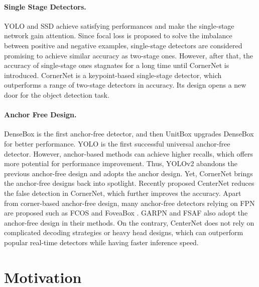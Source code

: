 \documentclass[letterpaper]{article} \usepackage{aaai20}  \usepackage{times}  \usepackage{helvet} \usepackage{courier}  \usepackage[hyphens]{url}  \usepackage{graphicx} \urlstyle{rm} \def\UrlFont{\rm}  \usepackage{graphicx}  \frenchspacing  \setlength{\pdfpagewidth}{8.5in}  \setlength{\pdfpageheight}{11in}  \usepackage{subcaption}
\begin{document}
\paragraph{Single Stage Detectors.} YOLO \cite{redmon2016you} and SSD \cite{liu2016ssd} achieve satisfying performances and make the single-stage network gain attention. Since focal loss is proposed \cite{lin2017focal} to solve the imbalance between positive and negative examples, single-stage detectors are considered promising to achieve similar accuracy as two-stage ones. However, after that, the accuracy of single-stage ones stagnates for a long time until CornerNet \cite{law2018cornernet} is introduced. CornerNet is a keypoint-based single-stage detector, which outperforms a range of two-stage detectors in accuracy. Its design opens a new door for the object detection task.

\paragraph{Anchor Free Design.} DenseBox \cite{DBLP:journals/corr/HuangYDY15} is the first anchor-free detector, and then UnitBox \cite{yu2016unitbox} upgrades DenseBox for better performance. YOLO is the first successful universal anchor-free detector. However, anchor-based methods \cite{ren2015faster,liu2016ssd} can achieve higher recalls, which offers more potential for performance improvement. Thus, YOLOv2 \cite{redmon2017yolo9000} abandons the previous anchor-free design and adopts the anchor design. Yet, CornerNet brings the anchor-free designs back into spotlight. Recently proposed CenterNet \cite{DBLP:journals/corr/abs-1904-08189} reduces the false detection in CornerNet, which further improves the accuracy. Apart from corner-based anchor-free design, many anchor-free detectors relying on FPN are proposed such as FCOS \cite{DBLP:journals/corr/abs-1904-01355} and FoveaBox \cite{DBLP:journals/corr/abs-1904-03797}. GARPN \cite{wang2019region} and FSAF \cite{DBLP:journals/corr/abs-1903-00621} also adopt the anchor-free design in their methods. On the contrary, CenterNet \cite{DBLP:journals/corr/abs-1904-07850} does not rely on complicated decoding strategies or heavy head designs, which can outperform popular real-time detectors \cite{liu2016ssd,redmon2018yolov3} while having faster inference speed.


\section{Motivation}
\end{document}
